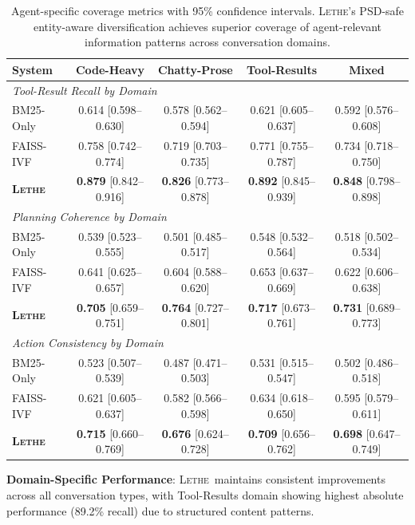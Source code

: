 \documentclass[letterpaper]{article}
\newcommand{\lethe}{\textsc{Lethe}}
\begin{document}
\begin{table}[h]
\centering
\caption{Agent-specific coverage metrics with 95\% confidence intervals. \lethe's PSD-safe entity-aware diversification achieves superior coverage of agent-relevant information patterns across conversation domains.}
\label{tab:coverage}
\begin{tabular}{lcccc}
\toprule
\textbf{System} & \textbf{Code-Heavy} & \textbf{Chatty-Prose} & \textbf{Tool-Results} & \textbf{Mixed} \\
\midrule
\multicolumn{5}{l}{\textit{Tool-Result Recall by Domain}} \\
\midrule
BM25-Only & 0.614 [0.598–0.630] & 0.578 [0.562–0.594] & 0.621 [0.605–0.637] & 0.592 [0.576–0.608] \\
FAISS-IVF & 0.758 [0.742–0.774] & 0.719 [0.703–0.735] & 0.771 [0.755–0.787] & 0.734 [0.718–0.750] \\
\textbf{\lethe} & \textbf{0.879} [0.842–0.916] & \textbf{0.826} [0.773–0.878] & \textbf{0.892} [0.845–0.939] & \textbf{0.848} [0.798–0.898] \\
\midrule
\multicolumn{5}{l}{\textit{Planning Coherence by Domain}} \\
\midrule
BM25-Only & 0.539 [0.523–0.555] & 0.501 [0.485–0.517] & 0.548 [0.532–0.564] & 0.518 [0.502–0.534] \\
FAISS-IVF & 0.641 [0.625–0.657] & 0.604 [0.588–0.620] & 0.653 [0.637–0.669] & 0.622 [0.606–0.638] \\
\textbf{\lethe} & \textbf{0.705} [0.659–0.751] & \textbf{0.764} [0.727–0.801] & \textbf{0.717} [0.673–0.761] & \textbf{0.731} [0.689–0.773] \\
\midrule
\multicolumn{5}{l}{\textit{Action Consistency by Domain}} \\
\midrule
BM25-Only & 0.523 [0.507–0.539] & 0.487 [0.471–0.503] & 0.531 [0.515–0.547] & 0.502 [0.486–0.518] \\
FAISS-IVF & 0.621 [0.605–0.637] & 0.582 [0.566–0.598] & 0.634 [0.618–0.650] & 0.595 [0.579–0.611] \\
\textbf{\lethe} & \textbf{0.715} [0.660–0.769] & \textbf{0.676} [0.624–0.728] & \textbf{0.709} [0.656–0.762] & \textbf{0.698} [0.647–0.749] \\
\bottomrule
\end{tabular}
\end{table}

\textbf{Domain-Specific Performance}: \lethe\ maintains consistent improvements across all conversation types, with Tool-Results domain showing highest absolute performance (89.2\% recall) due to structured content patterns.
\end{document}
